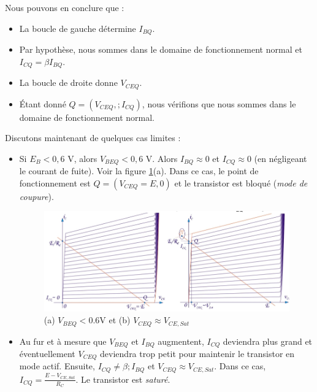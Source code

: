 Nous pouvons en conclure que :
\begin{itemize}
	\item La boucle de gauche détermine $I_{BQ}$.
	\item Par hypothèse, nous sommes dans le domaine de fonctionnement normal et $I_{CQ} = \beta I_{BQ}$.
	\item La boucle de droite donne $V_{CEQ}$.
	\item Étant donné $Q = (V_{CEQ}, ; I_{CQ})$, nous vérifions que nous sommes dans le domaine de fonctionnement normal.
\end{itemize}
Discutons maintenant de quelques cas limites :
\begin{itemize}
	\item Si $E_B < 0,6$ V, alors $V_{BEQ} < 0,6$ V. Alors $I_{BQ} \approx 0$ et $I_{CQ} \approx 0$ (en négligeant le courant de fuite). Voir la figure \ref{fig:bjt_load3}(a). Dans ce cas, le point de fonctionnement est $Q = (V_{CEQ} = E, 0)$ et le transistor est bloqué (\emph{mode de coupure}).
	\begin{figure}[h!]
		\centering
		\includegraphics[width=14cm]{figures/ch02/bjt_load3.jpg}
		\caption{(a) $V_{BEQ} < 0.6$V et (b) $V_{CEQ} \approx V_{CE, Sat}$}
		\label{fig:bjt_load3}
	\end{figure}
	\item Au fur et à mesure que $V_{BEQ}$ et $I_{BQ}$ augmentent, $I_{CQ}$ deviendra plus grand et éventuellement $V_{CEQ}$ deviendra trop petit pour maintenir le transistor en mode actif. Ensuite, $I_{CQ} \ne \beta ;I_{BQ}$ et $V_{CEQ} \approx V_{CE, Sat}$. Dans ce cas, $I_{CQ} = \frac{E-V_{CE,Sat}}{R_C}$. Le transistor est \emph{saturé}.
\end{itemize}

